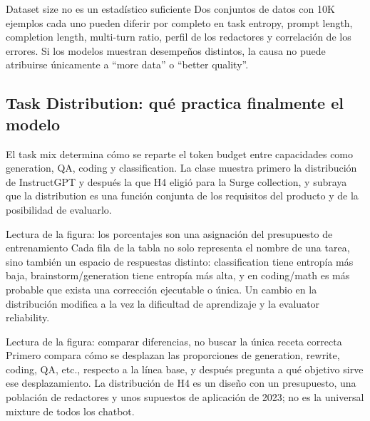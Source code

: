 
\begin{importantbox}{Dataset size no es un estadístico suficiente}
Dos conjuntos de datos con 10K ejemplos cada uno pueden diferir por completo en task entropy, prompt length, completion length, multi-turn ratio, perfil de los redactores y correlación de los errores. Si los modelos muestran desempeños distintos, la causa no puede atribuirse únicamente a ``more data'' o ``better quality''.
\end{importantbox}

\subsection{Task Distribution: qué practica finalmente el modelo}

El task mix determina cómo se reparte el token budget entre capacidades como generation, QA, coding y classification. La clase muestra primero la distribución de InstructGPT y después la que H4 eligió para la Surge collection, y subraya que la distribution es una función conjunta de los requisitos del producto y de la posibilidad de evaluarlo.


\begin{knowledgebox}{Lectura de la figura: los porcentajes son una asignación del presupuesto de entrenamiento}
Cada fila de la tabla no solo representa el nombre de una tarea, sino también un espacio de respuestas distinto: classification tiene entropía más baja, brainstorm/generation tiene entropía más alta, y en coding/math es más probable que exista una corrección ejecutable o única. Un cambio en la distribución modifica a la vez la dificultad de aprendizaje y la evaluator reliability.
\end{knowledgebox}


\begin{knowledgebox}{Lectura de la figura: comparar diferencias, no buscar la única receta correcta}
Primero compara cómo se desplazan las proporciones de generation, rewrite, coding, QA, etc., respecto a la línea base, y después pregunta a qué objetivo sirve ese desplazamiento. La distribución de H4 es un diseño con un presupuesto, una población de redactores y unos supuestos de aplicación de 2023; no es la universal mixture de todos los chatbot.
\end{knowledgebox}

